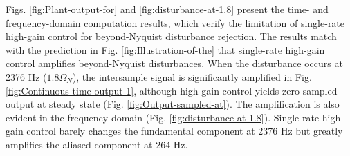 \documentclass [11pt, proquest] {uwthesis}[2020/02/24]
\begin{document}
Figs. \ref{fig:Plant-output-for} and \ref{fig:disturbance-at-1.8}
present the time- and frequency-domain computation results, which
verify the limitation of single-rate high-gain control for beyond-Nyquist
disturbance rejection. The results match with the prediction in Fig.
\ref{fig:Illustration-of-the} that single-rate high-gain control
amplifies beyond-Nyquist disturbances. When the disturbance occurs
at 2376 Hz ($1.8\Omega_{N}$), the intersample signal is significantly
amplified in Fig. \ref{fig:Continuous-time-output-1}, although high-gain
control yields zero sampled-output at steady state (Fig. \ref{fig:Output-sampled-at}).
The amplification is also evident in the frequency domain (Fig. \ref{fig:disturbance-at-1.8}).
Single-rate high-gain control barely changes the fundamental component
at 2376 Hz but greatly amplifies the aliased component at 264 Hz.
\end{document}
